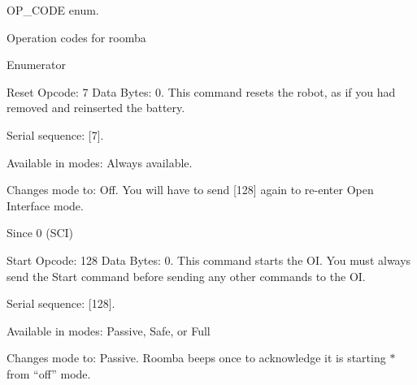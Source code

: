 O\+P\+\_\+\+C\+O\+D\+E enum. 

Operation codes for roomba \begin{Desc}
\item[Enumerator]\par
\begin{description}
\item[{\em 
\hypertarget{group__roomba-lib_gga305e17dfb7050ad83ea49ded2e6a2e24a42d615c28dbc113dcc6d742efe148eb6}{}R\+O\+O\+M\+B\+A\+\_\+\+R\+E\+S\+E\+T\label{group__roomba-lib_gga305e17dfb7050ad83ea49ded2e6a2e24a42d615c28dbc113dcc6d742efe148eb6}
}]Reset Opcode\+: 7 Data Bytes\+: 0. This command resets the robot, as if you had removed and reinserted the battery.
\begin{DoxyItemize}
\item Serial sequence\+: \mbox{[}7\mbox{]}.
\item Available in modes\+: Always available.
\item Changes mode to\+: Off. You will have to send \mbox{[}128\mbox{]} again to re-\/enter Open Interface mode.
\end{DoxyItemize}

\begin{DoxySince}{Since}
0 (S\+C\+I) 
\end{DoxySince}
\item[{\em 
\hypertarget{group__roomba-lib_gga305e17dfb7050ad83ea49ded2e6a2e24a2a01acef0ce68b399d3d0ff55e2c9439}{}R\+O\+O\+M\+B\+A\+\_\+\+S\+T\+A\+R\+T\label{group__roomba-lib_gga305e17dfb7050ad83ea49ded2e6a2e24a2a01acef0ce68b399d3d0ff55e2c9439}
}]Start Opcode\+: 128 Data Bytes\+: 0. This command starts the O\+I. You must always send the Start command before sending any other commands to the O\+I.
\begin{DoxyItemize}
\item Serial sequence\+: \mbox{[}128\mbox{]}.
\item Available in modes\+: Passive, Safe, or Full
\item Changes mode to\+: Passive. Roomba beeps once to acknowledge it is starting $\ast$ from “off” mode.
\end{DoxyItemize}


\end{description}
\end{Desc}
